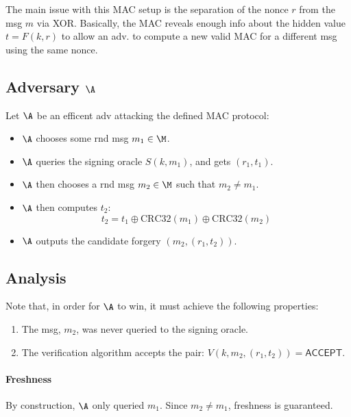 \documentclass[12pt]{article}
\begin{document}
\begin{solution}
The main issue with this MAC setup is the separation of the nonce $r$ from the msg $m$ via XOR. Basically, the MAC reveals enough info about the hidden value $t = F(k, r)$ to allow an adv. to compute a new valid MAC for a different msg using the same nonce.

\subsection*{Adversary $\A$}
Let $\A$ be an efficent adv attacking the defined MAC protocol:
\begin{itemize}
    \item $\A$ chooses some rnd msg $m_1 \in \M$.
    \item $\A$ queries the signing oracle $S(k, m_1)$, and gets $(r_1, t_1)$.
    \item $\A$ then chooses a rnd msg $m_2 \in \M$ such that $m_2 \neq m_1$.
    \item $\A$ then computes $t_2$:
    \begin{equation*}
        t_2 = t_1 \oplus \text{CRC32}(m_1) \oplus \text{CRC32}(m_2)
    \end{equation*}
    \item $\A$ outputs the candidate forgery $(m_2, (r_1, t_2))$.
\end{itemize}

\subsection*{Analysis}
Note that, in order for $\A$ to win, it must achieve the following properties:
\begin{enumerate}
    \item The msg, $m_2$, was never queried to the signing oracle.
    \item The verification algorithm accepts the pair: $V(k, m_2, (r_1, t_2)) = \textsf{ACCEPT}$.
\end{enumerate}

\paragraph{Freshness} By construction, $\A$ only queried $m_1$. Since $m_2 \neq m_1$, freshness is guaranteed.


\end{solution}
\end{document}

